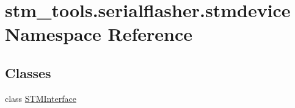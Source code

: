\hypertarget{namespacestm__tools_1_1serialflasher_1_1stmdevice}{}\section{stm\+\_\+tools.\+serialflasher.\+stmdevice Namespace Reference}
\label{namespacestm__tools_1_1serialflasher_1_1stmdevice}
\subsection*{Classes}
\begin{DoxyCompactItemize}
\item 
class \hyperlink{classstm__tools_1_1serialflasher_1_1stmdevice_1_1STMInterface}{S\+T\+M\+Interface}
\end{DoxyCompactItemize}
